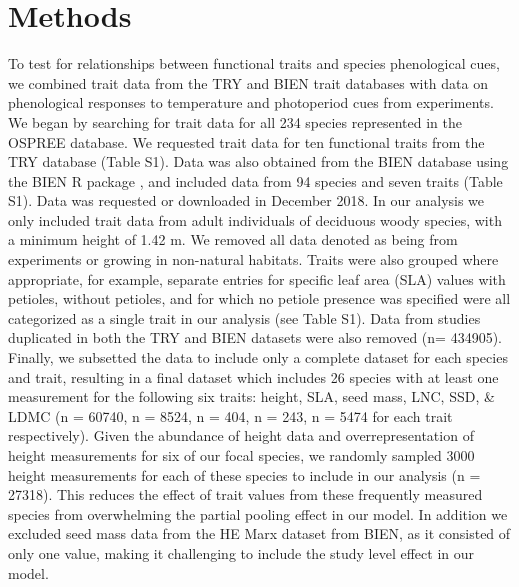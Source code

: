 \documentclass{article}\usepackage[]{graphicx}\usepackage[]{color}
\begin{document}
\section{Methods}
To test for relationships between functional traits and species phenological cues, we combined trait data from the TRY and BIEN trait databases with data on phenological responses to temperature and photoperiod cues from experiments. We began by searching for trait data for all 234 species represented in the OSPREE database. We requested trait data for ten functional traits from the TRY database (Table S1). Data was also obtained from the BIEN database using the BIEN R package \citep{Maitner2017}, and included data from 94 species and seven traits (Table S1). Data was requested or downloaded in December 2018. In our analysis we only included trait data from adult individuals of deciduous woody species, with a minimum height of 1.42 m. We removed all data denoted as being from experiments or growing in non-natural habitats. Traits were also grouped where appropriate, for example, separate entries for specific leaf area (SLA) values with petioles, without petioles, and for which no petiole presence was specified were all categorized as a single trait in our analysis (see Table S1). Data from studies duplicated in both the TRY and BIEN datasets were also removed (n= 434905).  Finally, we subsetted the data to include only a complete dataset for each species and trait, resulting in a final dataset which includes 26 species with at least one measurement for the following six traits: height, SLA, seed mass, LNC, SSD, \& LDMC (n = 60740, n = 8524, n = 404, n = 243, n = 5474 for each trait respectively). Given the abundance of height data and overrepresentation of height measurements for six of our focal species, we randomly sampled 3000 height measurements for each of these species to include in our analysis (n = 27318). This reduces the effect of trait values from these frequently measured species from overwhelming the partial pooling effect in our model. In addition we excluded seed mass data from the HE Marx dataset from BIEN, as it consisted of only one value, making it challenging to include the study level effect in our model.%
\end{document}
